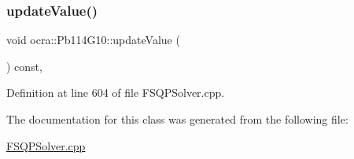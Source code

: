 \hypertarget{classocra_1_1Pb114G10_a8bdb81b11c37543a833cd09b199d9a1c}{}\label{classocra_1_1Pb114G10_a8bdb81b11c37543a833cd09b199d9a1c} 
\subsubsection{\texorpdfstring{update\+Value()}{updateValue()}}
{\footnotesize\ttfamily void ocra\+::\+Pb114\+G10\+::update\+Value (\begin{DoxyParamCaption}{ }\end{DoxyParamCaption}) const\hspace{0.3cm}{\ttfamily [inline]}, {\ttfamily [protected]}}



Definition at line 604 of file F\+S\+Q\+P\+Solver.\+cpp.



The documentation for this class was generated from the following file\+:\begin{DoxyCompactItemize}
\item 
\hyperlink{FSQPSolver_8cpp}{F\+S\+Q\+P\+Solver.\+cpp}\end{DoxyCompactItemize}
